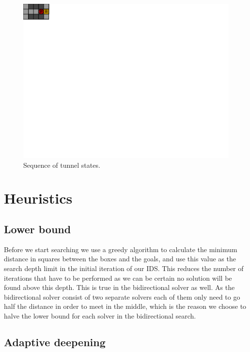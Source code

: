 \documentclass[a4paper,11pt]{article}
\renewcommand{\*}[0]{\cdot}
\begin{document}
\begin{figure}[h!]
\begin{center}
        \includegraphics{figures/insideTunnel3}
    \end{center}
    \caption{Sequence of tunnel states.}
    \label{fig:insideTunnel}
\end{figure}



\section{Heuristics}

\subsection{Lower bound}

Before we start searching we use a greedy algorithm to calculate the minimum
distance in squares between the boxes and the goals, and use this value as the
search depth limit in the initial iteration of our IDS. This reduces the number
of iterations that have to be performed as we can be certain no solution will be
found above this depth. This is true in the bidirectional solver as well. As the
bidirectional solver consist of two separate solvers each of them only need to
go half the distance in order to meet in the middle, which is the reason we
choose to halve the lower bound for each solver in the bidirectional search.

\subsection{Adaptive deepening}
\end{document}
